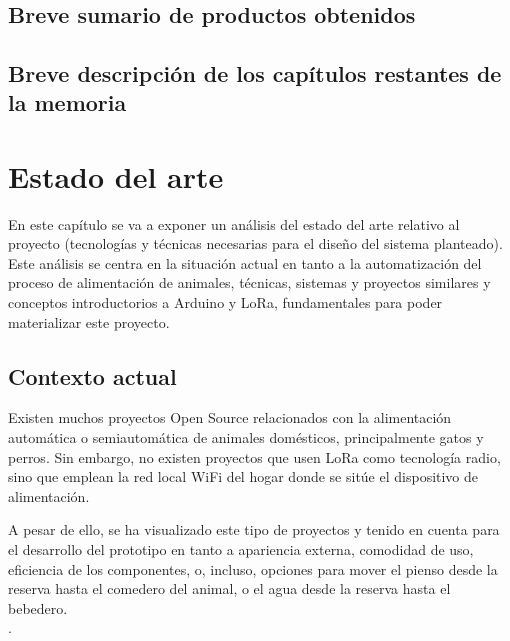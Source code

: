 \documentclass[12pt]{article}
\begin{document}
	 \\
	
	\subsection[Breve sumario de productos obtenidos]{Breve sumario de productos obtenidos}
	\subsection[Breve descripción de los capítulos restantes de la memoria]{Breve descripción de los capítulos restantes de la memoria}
	
	\pagebreak
	

	\section[Estado del arte]{Estado del arte}  
	
	\noindent En este capítulo se va a exponer un análisis del estado del arte relativo al proyecto (tecnologías y técnicas necesarias para el diseño del sistema planteado). Este análisis se centra en la situación actual en tanto a  la automatización del proceso de alimentación de animales, técnicas, sistemas y proyectos similares y conceptos introductorios a Arduino y LoRa, fundamentales para poder materializar este proyecto.
	
	\subsection[Contexto actual]{Contexto actual}
	
		\noindent Existen muchos proyectos Open Source relacionados con la alimentación automática o semiautomática de animales domésticos, principalmente gatos y perros. Sin embargo, no existen proyectos que usen LoRa como tecnología radio, sino que emplean la red local WiFi del hogar donde se sitúe el dispositivo de alimentación.
	
	\noindent A pesar de ello, se ha visualizado este tipo de proyectos y tenido en cuenta para el desarrollo del prototipo en tanto a apariencia externa, comodidad de uso, eficiencia de los componentes, o, incluso, opciones para mover el pienso desde la reserva hasta el comedero del animal, o el agua desde la reserva hasta el bebedero. \\
	
	. \\
	
\end{document}
